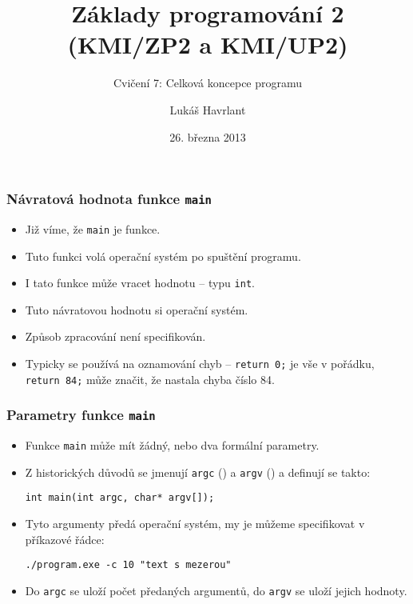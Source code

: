 \documentclass{beamer}
\title{Základy programování 2 (KMI/ZP2 a KMI/UP2)}
\subtitle{Cvičení 7: Celková koncepce programu}
\author{Lukáš Havrlant}
\date{26. března 2013}
\institute{Univerzita Palackého}
\newenvironment{itemizex}%
  {\large \begin{itemize}%
    \setlength{\itemsep}{8pt}%
    \setlength{\parskip}{8pt}}%
  {\end{itemize}}
\begin{document}
\begin{frame}[t,plain]
\titlepage
\end{frame}



\begin{frame}[t,fragile]\frametitle{Návratová hodnota funkce \texttt{main}} 
    \begin{itemizex}
        \item Již víme, že \texttt{main} je funkce.
        \item Tuto funkci volá operační systém po spuštění programu. 
        \item I tato funkce může vracet hodnotu -- typu \texttt{int}.
        \item Tuto návratovou hodnotu si  operační systém.
        \item Způsob zpracování není specifikován.
        \item Typicky se používá na oznamování chyb -- \texttt{return 0;} je vše v pořádku, \texttt{return 84;} může značit, že nastala chyba číslo 84.
    \end{itemizex}
\end{frame}


\begin{frame}[t,fragile]\frametitle{Parametry funkce \texttt{main}} 
    \begin{itemizex}
        \item Funkce \texttt{main} může mít žádný, nebo dva formální parametry.
        \item Z historických důvodů se jmenují \texttt{argc} () a \texttt{argv} () a definují se takto:
\begin{verbatim} 
int main(int argc, char* argv[]);
\end{verbatim}
        \item Tyto argumenty předá operační systém, my je můžeme specifikovat v příkazové řádce:
\begin{verbatim} 
./program.exe -c 10 "text s mezerou"
\end{verbatim}
        \item Do \texttt{argc} se uloží počet předaných argumentů, do \texttt{argv} se uloží jejich hodnoty.
    \end{itemizex}
\end{frame}
\end{document}
